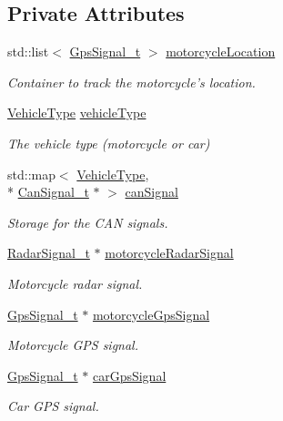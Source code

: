 \subsection*{Private Attributes}
\begin{DoxyCompactItemize}
\item 
std\-::list$<$ \hyperlink{structGpsSignal__t}{Gps\-Signal\-\_\-t} $>$ \hyperlink{classMotorcycleAwarenessSystem_af6becfeb1d11b467cb80a94a8e6940ac}{motorcycle\-Location}
\begin{DoxyCompactList}\small\item\em Container to track the motorcycle's location. \end{DoxyCompactList}\item 
\hyperlink{MotorcycleAwarenessSystemTypes_8hpp_a0c05c42b98a847f971385c81c2a81afa}{Vehicle\-Type} \hyperlink{classMotorcycleAwarenessSystem_a977b2085bfbf6a62902bf2d80160e6d2}{vehicle\-Type}
\begin{DoxyCompactList}\small\item\em The vehicle type (motorcycle or car) \end{DoxyCompactList}\item 
std\-::map$<$ \hyperlink{MotorcycleAwarenessSystemTypes_8hpp_a0c05c42b98a847f971385c81c2a81afa}{Vehicle\-Type}, \\*
\hyperlink{structCanSignal__t}{Can\-Signal\-\_\-t} $\ast$ $>$ \hyperlink{classMotorcycleAwarenessSystem_a2d8ac602ae24dcf38aaa95a42ffb4e1f}{can\-Signal}
\begin{DoxyCompactList}\small\item\em Storage for the C\-A\-N signals. \end{DoxyCompactList}\item 
\hyperlink{structRadarSignal__t}{Radar\-Signal\-\_\-t} $\ast$ \hyperlink{classMotorcycleAwarenessSystem_a0744e71b9f440a86f5078c876ba7629b}{motorcycle\-Radar\-Signal}
\begin{DoxyCompactList}\small\item\em Motorcycle radar signal. \end{DoxyCompactList}\item 
\hyperlink{structGpsSignal__t}{Gps\-Signal\-\_\-t} $\ast$ \hyperlink{classMotorcycleAwarenessSystem_ab281a3993b574923b2f379ed0477b2d4}{motorcycle\-Gps\-Signal}
\begin{DoxyCompactList}\small\item\em Motorcycle G\-P\-S signal. \end{DoxyCompactList}\item 
\hyperlink{structGpsSignal__t}{Gps\-Signal\-\_\-t} $\ast$ \hyperlink{classMotorcycleAwarenessSystem_a9a8185e00b60d0be58bfa76166063128}{car\-Gps\-Signal}
\begin{DoxyCompactList}\small\item\em Car G\-P\-S signal. \end{DoxyCompactList}\end{DoxyCompactItemize}
